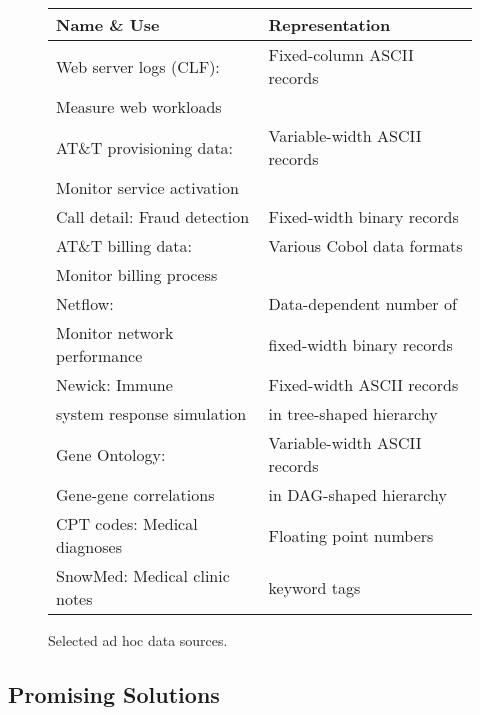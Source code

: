 \begin{figure}
\begin{center}
\begin{tabular}{|l|l|}
\hline
Name \& Use   &  Representation               \\ \hline\hline
Web server logs (CLF):  &  Fixed-column ASCII records \\ 
Measure web workloads &                             \\ \hline
AT\&T provisioning data: & Variable-width ASCII records  \\ 
Monitor service activation &                              \\ \hline
Call detail: Fraud detection  &  Fixed-width binary records \\  \hline 
AT\&T billing data: & Various Cobol data formats  \\ 
Monitor billing process   &                             \\ \hline
Netflow:                        & Data-dependent number of     \\ 
Monitor network performance  & fixed-width binary records  \\ \hline
Newick:   Immune                 & Fixed-width ASCII records \\ 
system response simulation & in tree-shaped hierarchy\\ \hline                                
Gene Ontology:             & Variable-width ASCII records \\
Gene-gene correlations     & in DAG-shaped hierarchy \\ \hline
CPT codes: Medical diagnoses & Floating point numbers \\ \hline
SnowMed: Medical clinic notes & keyword tags  \\ \hline


\end{tabular}


\caption{Selected ad hoc data sources.}
\label{figure:data-sources}
\end{center}
\end{figure}
 
\subsection{Promising Solutions}

